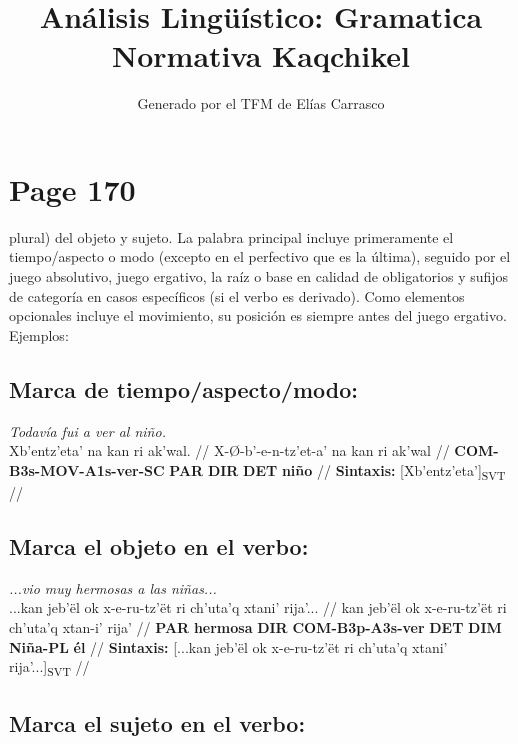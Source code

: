 \documentclass{article}%
\title{Análisis Lingüístico: Gramatica Normativa Kaqchikel}%
\author{Generado por el TFM de Elías Carrasco}%
\begin{document}
%
\normalsize%
\maketitle%
\section{Page 170}%
\label{sec:Page170}%
plural) del objeto y sujeto. La palabra principal incluye primeramente el tiempo/aspecto %
o modo (excepto en el perfectivo que es la última), seguido por el juego absolutivo, %
juego ergativo, la raíz o base en calidad de obligatorios y sufijos de categoría en casos %
específicos (si el verbo es derivado). Como elementos opcionales incluye el movimiento, %
su posición es siempre antes del juego ergativo. Ejemplos: %
\subsection{Marca de tiempo/aspecto/modo:}%
\label{subsec:Marcadetiempo/aspecto/modo}%

%
\par\medskip%
\ex
\textit{Todavía fui a ver al niño.} \\
\begingl
\gla Xb'entz'eta' na kan ri ak'wal. //
\glb X-Ø-b'-e-n-tz'et-a' na kan ri ak'wal //
\glc \textbf{COM-}\textbf{B3s-}\textbf{MOV-}\textbf{A1s-}\textbf{ver-}\textbf{SC}\textbf{} \textbf{PAR} \textbf{DIR} \textbf{DET} \textbf{niño} //
\glft \textbf{Sintaxis:} [Xb'entz'eta']\textsubscript{SVT} //
\endgl
\xe
%
\medskip%
\subsection{Marca el objeto en el verbo:}%
\label{subsec:Marcaelobjetoenelverbo}%

%
\par\medskip%
\ex
\textit{...vio muy hermosas a las niñas...} \\
\begingl
\gla ...kan jeb'ël ok x-e-ru-tz'ët ri ch'uta'q xtani' rija'... //
\glb kan jeb'ël ok x-e-ru-tz'ët ri ch'uta'q xtan-i' rija' //
\glc \textbf{PAR} \textbf{hermosa} \textbf{DIR} \textbf{COM-}\textbf{B3p-}\textbf{A3s-}\textbf{ver} \textbf{DET} \textbf{DIM} \textbf{Niña-}\textbf{PL} \textbf{él} //
\glft \textbf{Sintaxis:} [...kan jeb'ël ok x-e-ru-tz'ët ri ch'uta'q xtani' rija'...]\textsubscript{SVT} //
\endgl
\xe
%
\medskip%
\subsection{Marca el sujeto en el verbo:}%
\label{subsec:Marcaelsujetoenelverbo}%
\end{document}
